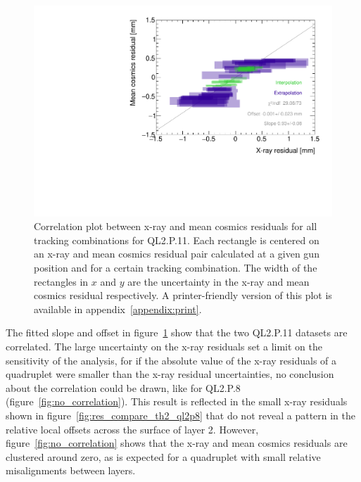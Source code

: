 \begin{figure}
    \centering
    \includegraphics[width = \textwidth]{figures/figure_QL2P11_3100V_2021-08-05_QL2P11_local_cosmic_and_xray_data_correlation_plot.pdf}
    \caption{Correlation plot between x-ray and mean cosmics residuals for all tracking combinations for QL2.P.11. Each rectangle is centered on an x-ray and mean cosmics residual pair calculated at a given gun position and for a certain tracking combination. The width of the rectangles in $x$ and $y$ are the uncertainty in the x-ray and mean cosmics residual respectively. A printer-friendly version of this plot is available in appendix~\ref{appendix:print}.}
    \label{fig:correlation}
\end{figure}

The fitted slope and offset in figure~\ref{fig:correlation} show that the two QL2.P.11 datasets are correlated. The large uncertainty on the x-ray residuals set a limit on the sensitivity of the analysis, for if the absolute value of the x-ray residuals of a quadruplet were smaller than the x-ray residual uncertainties, no conclusion about the correlation could be drawn, like for QL2.P.8 (figure~\ref{fig:no_correlation}). This result is reflected in the small x-ray residuals shown in figure~\ref{fig:res_compare_th2_ql2p8} that do not reveal a pattern in the relative local offsets across the surface of layer 2. However, figure~\ref{fig:no_correlation} shows that the x-ray and mean cosmics residuals are clustered around zero, as is expected for a quadruplet with small relative misalignments between layers.

